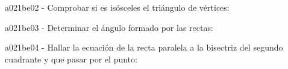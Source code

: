 \documentclass[spanish, 11pt]{exam}
\begin{document}
\begin{questions}
\begin{multicols}{2}
\begin{parts}
        \end{parts}
        \end{multicols}
        \question a021be02 - Comprobar si es isósceles el triángulo de vértices:
        \begin{multicols}{2} 
        \end{multicols}
        \question a021be03 - Determinar el ángulo formado por las rectas:
        \begin{multicols}{2} 
        \end{multicols}
        \question a021be04 - Hallar la ecuación de la recta paralela a la bisectriz del segundo cuadrante y que pasar por el punto:
        \begin{multicols}{1} 
\end{multicols}
\end{questions}
\end{document}
